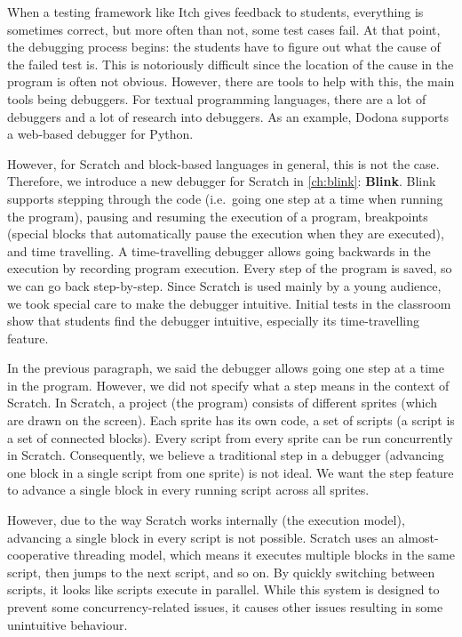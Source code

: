 \documentclass[main]{subfiles}
\begin{document}
When a testing framework like Itch gives feedback to students, everything is sometimes correct, but more often than not, some test cases fail.
At that point, the debugging process begins: the students have to figure out what the cause of the failed test is.
This is notoriously difficult since the location of the cause in the program is often not obvious.
However, there are tools to help with this, the main tools being debuggers.
For textual programming languages, there are a lot of debuggers and a lot of research into debuggers.
As an example, Dodona supports a web-based debugger for Python.

However, for Scratch and block-based languages in general, this is not the case.
Therefore, we introduce a new debugger for Scratch in \cref{ch:blink}: \textbf{Blink}.
Blink supports stepping through the code (i.e.\ going one step at a time when running the program), pausing and resuming the execution of a program, breakpoints (special blocks that automatically pause the execution when they are executed), and time travelling.
A time-travelling debugger allows going backwards in the execution by recording program execution.
Every step of the program is saved, so we can go back step-by-step.
Since Scratch is used mainly by a young audience, we took special care to make the debugger intuitive.
Initial tests in the classroom show that students find the debugger intuitive, especially its time-travelling feature.

In the previous paragraph, we said the debugger allows going one step at a time in the program.
However, we did not specify what a step means in the context of Scratch.
In Scratch, a project (the program) consists of different sprites (which are drawn on the screen).
Each sprite has its own code, a set of scripts (a script is a set of connected blocks).
Every script from every sprite can be run concurrently in Scratch.
Consequently, we believe a traditional step in a debugger (advancing one block in a single script from one sprite) is not ideal.
We want the step feature to advance a single block in every running script across all sprites.

However, due to the way Scratch works internally (the execution model), advancing a single block in every script is not possible.
Scratch uses an almost-cooperative threading model, which means it executes multiple blocks in the same script, then jumps to the next script, and so on.
By quickly switching between scripts,
it looks like scripts execute in parallel.
While this system is designed to prevent some concurrency-related issues, it causes other issues resulting in some unintuitive behaviour.
\end{document}
